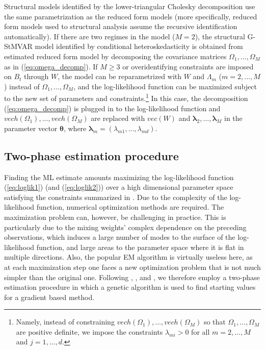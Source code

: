 \documentclass[nojss]{jss}
\begin{document}
Structural models identified by the lower-triangular Cholesky decomposition use the same parametrization as the reduced form models (more specifically, reduced form models used to structural analysis assume the recursive identification automatically). If there are two regimes in the model ($M=2$), the structural G-StMVAR model identified by conditional heteroskedasticity is obtained from estimated reduced form model by decomposing the covariance matrices $\Omega_1,...,\Omega_M$ as in (\ref{eq:omega_decomp}). If $M\geq 3$ or overidentifying constraints are imposed on $B_t$ through $W$,  the model can be reparametrized with $W$ and $\Lambda_m$ ($m=2,...,M$) instead of $\Omega_1,...,\Omega_M$,  and the log-likelihood function can be maximized subject to the new set of parameters and constraints.\footnote{Namely,  instead of constraining $vech(\Omega_1),...,vech(\Omega_M)$ so that $\Omega_1,...,\Omega_M$ are positive definite,  we impose the constraints $\lambda_{mi}>0$ for all $m=2,...,M$ and $j=1,...,d$.} In this case, the decomposition (\ref{eq:omega_decomp}) is plugged in to the log-likelihood function and $vech(\Omega_1),...,vech(\Omega_M)$ are replaced with $vec(W)$ and $\boldsymbol{\lambda}_2,...,\boldsymbol{\lambda}_M$ in the parameter vector $\boldsymbol{\theta}$,  where $\boldsymbol{\lambda}_m=(\lambda_{m1},...,\lambda_{md})$.


\subsection{Two-phase estimation procedure}\label{sec:estimscheme}
Finding the ML estimate amounts maximizing the log-likelihood function (\ref{eq:loglik1}) (and (\ref{eq:loglik2})) over a high dimensional parameter space satisfying the constraints summarized in \citet[Assumption 1]{Virolainen2:2021}.  Due to the complexity of the log-likelihood function, numerical optimization methods are required.  The maximization problem can, however, be challenging in practice.  This is particularly due to the mixing weights' complex dependence on the preceding observations,  which induces a large number of modes to the surface of the log-likelihood function, and large areas to the parameter space where it is flat in multiple directions.  Also, the popular EM algorithm \citep{Redner+Walker:1984} is virtually useless here,  as at each maximization step one faces a new optimization problem that is not much simpler than the original one.  Following \cite{Meitz+Preve+Saikkonen2:2018}, \cite{Meitz+Preve+Saikkonen:2021}, and \cite{Virolainen:2021, uGMAR}, we therefore employ a two-phase estimation procedure in which a genetic algorithm is used to find starting values for a gradient based method.
\end{document}
